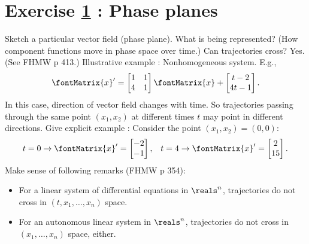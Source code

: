 %
%
%
%
%

\section{Exercise \ref{sec : Math211 Summer2019 ExamOral Phase Planes} : Phase planes}
\label{sec : Math211 Summer2019 ExamOral Phase Planes}

Sketch a particular vector field (phase plane). What is being represented? (How component functions move in phase space over time.) Can trajectories cross? Yes. (See FHMW p 413.) Illustrative example : Nonhomogeneous system. E.g.,
\begin{align}
\fontMatrix{x}'
=
\begin{bmatrix}%
1	&	1	\\
4	&	1
\end{bmatrix}%
\fontMatrix{x}
+
\begin{bmatrix}%
t - 2		\\
4 t - 1
\end{bmatrix}%
.%
\label{eq : Oral Exam Phase Plane ODE 1}
\end{align}
In this case, direction of vector field changes with time. So trajectories passing through the same point $(x_{1},x_{2})$ at different times $t$ may point in different directions. Give explicit example : Consider the point $(x_{1},x_{2}) = (0,0)$:
\begin{align*}
t = 0
\rightarrow
\fontMatrix{x}'
=
\begin{bmatrix}%
-2	\\
-1
\end{bmatrix}%
,
&&
t = 4
\rightarrow
\fontMatrix{x}'
=
\begin{bmatrix}%
2	\\
15
\end{bmatrix}%
.
\end{align*}
Make sense of following remarks (FHMW p 354):
\begin{itemize}
\item For a linear system of differential equations in $\reals^{n}$, trajectories do not cross in $(t,x_{1},\ldots,x_{n})$ space.
\item For an autonomous linear system in $\reals^{n}$, trajectories do not cross in $(x_{1},\ldots,x_{n})$ space, either.
\end{itemize}

